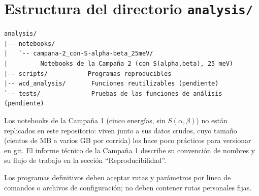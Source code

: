 \documentclass[11pt,a4paper]{article}
\begin{document}
\section{Estructura del directorio \texttt{analysis/}}

\begin{verbatim}
analysis/
|-- notebooks/
|   `-- campana-2_con-S-alpha-beta_25meV/
|         Notebooks de la Campaña 2 (con S(alpha,beta), 25 meV)
|-- scripts/           Programas reproducibles
|-- wcd_analysis/       Funciones reutilizables (pendiente)
`-- tests/              Pruebas de las funciones de análisis (pendiente)
\end{verbatim}

Los notebooks de la Campaña 1 (cinco energías, sin $S(\alpha,\beta)$) no están replicados en este
repositorio: viven junto a sus datos crudos, cuyo tamaño (cientos de MB a varios GB por corrida) los
hace poco prácticos para versionar en git. El informe técnico de la Campaña 1 describe su convención
de nombres y su flujo de trabajo en la sección ``Reproducibilidad''.

Los programas definitivos deben aceptar rutas y parámetros por línea de comandos o archivos de
configuración; no deben contener rutas personales fijas.
\end{document}
